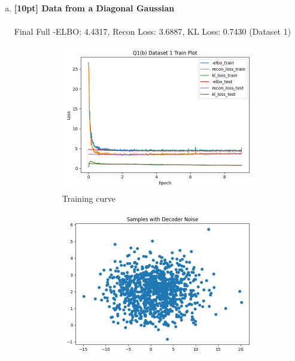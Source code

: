 \documentclass{article}
\begin{document}
\begin{enumerate}[(a)]
\newpage

\item {\bf [10pt] Data from a Diagonal Gaussian} \\\\
Final Full -ELBO: 4.4317, Recon Loss: 3.6887, KL Loss: 0.7430 (Dataset 1)
\begin{figure}[H]
    \centering
    \begin{subfigure}{0.32\textwidth}
        \centering
        \includegraphics[width=\textwidth]{figures/q1_b_dset1_train_plot.png}
        \caption{Training curve}
    \end{subfigure}
    \begin{subfigure}{0.32\textwidth}
        \centering
        \includegraphics[width=\textwidth]{figures/q1_b_dset1_sample_with_noise.png}

\end{subfigure}
\end{figure}
\end{enumerate}
\end{document}
